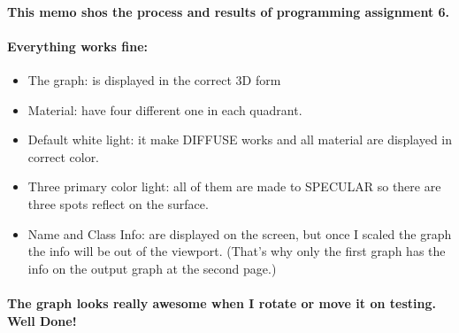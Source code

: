 \documentclass[a4paper,12pt]{texMemo}
\begin{document}
\maketitle

\paragraph{This memo shos the process and results of programming assignment 6.}

\paragraph{Everything works fine: }
\begin{itemize}
\item The graph: is displayed in the correct 3D form
\item Material: have four different one in each quadrant.
\item Default white light: it make DIFFUSE works and all material are displayed in correct color. 
\item Three primary color light: all of them are  made to SPECULAR so there are three spots reflect on the surface.
\item Name and Class Info: are displayed on the screen, but once I scaled the graph the info will be out of the viewport. (That's why only the first graph has the info on the output graph at the second page.)
\end{itemize}

\paragraph{The graph looks really awesome when I rotate or move it on testing. Well Done!}
\end{document}
